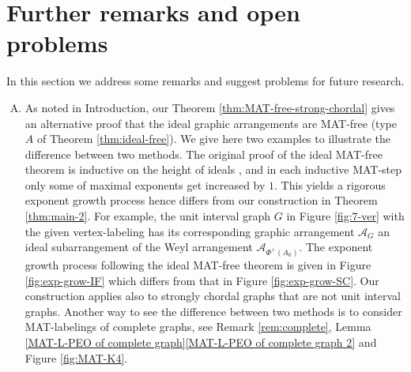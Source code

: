 \documentclass[ALCO, Unicode,published]{cedram}
\newcommand{\A}{\mathcal{A}}
\begin{document}
\section{Further remarks and open problems}
\label{sec:rem}
\quad
In this section we address some remarks and suggest problems for future research.
\begin{enumerate}[(A)]
\item
As noted in Introduction, our Theorem \ref{thm:MAT-free-strong-chordal} gives an alternative proof that the ideal graphic arrangements are MAT-free (type $A$ of Theorem \ref{thm:ideal-free}). 
We give here two examples to illustrate the difference between two methods. 
The original proof of the ideal MAT-free theorem is inductive on the height of ideals  \cite[\S5]{ABCHT16}, and in each inductive MAT-step only some of maximal exponents get increased by $1$. 
This yields a rigorous exponent growth process hence differs from  our construction in Theorem \ref{thm:main-2}. 
For example, the unit interval graph $G$ in Figure \ref{fig:7-ver} with the given vertex-labeling has its corresponding graphic arrangement $\A_G$ an ideal subarrangement of the Weyl arrangement $\A_{\Phi^+(A_{6})}$. 
The exponent growth process following the ideal MAT-free theorem is given in Figure \ref{fig:exp-grow-IF} which differs from that in Figure \ref{fig:exp-grow-SC}. 
Our construction applies also to strongly chordal graphs that are not unit interval graphs. 
Another way to see the difference between two methods is to consider MAT-labelings of complete graphs, see Remark \ref{rem:complete}, Lemma \ref{MAT-L-PEO of complete graph}\ref{MAT-L-PEO of complete graph 2} and Figure \ref{fig:MAT-K4}. 


\end{enumerate}
\end{document}
